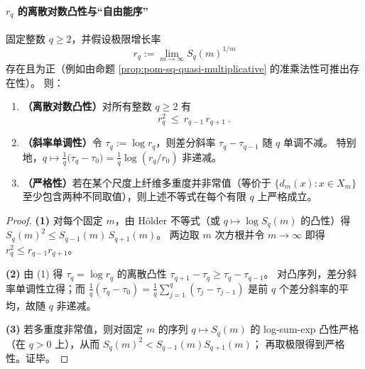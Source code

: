 \paragraph{\texorpdfstring{$r_q$}{rq} 的离散对数凸性与“自由能序”}
\begin{proposition}[增长率的离散对数凸性与斜率单调性]\label{prop:pom-rq-logconvex-free-energy-order}
固定整数 \(q\ge 2\)，并假设极限增长率
\[
r_q:=\lim_{m\to\infty}S_q(m)^{1/m}
\]
存在且为正（例如由命题 \ref{prop:pom-sq-quasi-multiplicative} 的准乘法性可推出存在性）。
则：
\begin{enumerate}
  \item \textbf{（离散对数凸性）}对所有整数 \(q\ge 2\) 有
  \[
  \boxed{\ r_q^{2}\ \le\ r_{q-1}\,r_{q+1}\ }.
  \]
  \item \textbf{（斜率单调性）}令 \(\tau_q:=\log r_q\)，则差分斜率 \(\tau_q-\tau_{q-1}\) 随 \(q\) 单调不减。
  特别地，\(q\mapsto \frac{1}{q}\bigl(\tau_q-\tau_0\bigr)=\frac{1}{q}\log(r_q/r_0)\) 非递减。
  \item \textbf{（严格性）}若在某个尺度上纤维多重度并非常值（等价于 \(\{d_m(x):x\in X_m\}\) 至少包含两种不同取值），则上述不等式在每个有限 \(q\) 上严格成立。
\end{enumerate}
\end{proposition}
\begin{proof}
\textbf{(1)} 对每个固定 \(m\)，由 Hölder 不等式（或 \(q\mapsto \log S_q(m)\) 的凸性）得
\(
S_q(m)^2\le S_{q-1}(m)\,S_{q+1}(m)
\)。
两边取 \(m\) 次方根并令 \(m\to\infty\) 即得 \(r_q^2\le r_{q-1}r_{q+1}\)。
\par
\textbf{(2)} 由 (1) 得 \(\tau_q=\log r_q\) 的离散凸性
\(
\tau_{q+1}-\tau_q\ge \tau_q-\tau_{q-1}
\)。
对凸序列，差分斜率单调性立得；而
\(
\frac{1}{q}(\tau_q-\tau_0)=\frac{1}{q}\sum_{j=1}^{q}(\tau_j-\tau_{j-1})
\)
是前 \(q\) 个差分斜率的平均，故随 \(q\) 非递减。
\par
\textbf{(3)} 若多重度非常值，则对固定 \(m\) 的序列 \(q\mapsto S_q(m)\) 的 log-sum-exp 凸性严格（在 \(q>0\) 上），从而 \(S_q(m)^2< S_{q-1}(m)S_{q+1}(m)\)；
再取极限得到严格性。证毕。
\end{proof}

